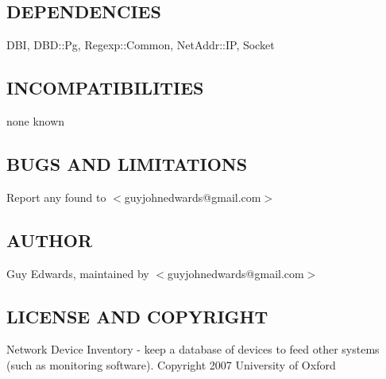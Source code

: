 \documentclass{book}
\begin{document}
\subsection{DEPENDENCIES}
\label{Inventory::Interfaces_DEPENDENCIES}
\hypertarget{Inventory::Interfaces_DEPENDENCIES}{}



DBI, DBD::Pg, Regexp::Common, NetAddr::IP, Socket


\subsection{INCOMPATIBILITIES}
\label{Inventory::Interfaces_INCOMPATIBILITIES}
\hypertarget{Inventory::Interfaces_INCOMPATIBILITIES}{}



none known


\subsection{BUGS AND LIMITATIONS}
\label{Inventory::Interfaces_BUGS_AND_LIMITATIONS}
\hypertarget{Inventory::Interfaces_BUGS_AND_LIMITATIONS}{}



Report any found to $<$guyjohnedwards@gmail.com$>$


\subsection{AUTHOR}
\label{Inventory::Interfaces_AUTHOR}
\hypertarget{Inventory::Interfaces_AUTHOR}{}



Guy Edwards, maintained by $<$guyjohnedwards@gmail.com$>$


\subsection{LICENSE AND COPYRIGHT}
\label{Inventory::Interfaces_LICENSE_AND_COPYRIGHT}
\hypertarget{Inventory::Interfaces_LICENSE_AND_COPYRIGHT}{}



Network Device Inventory - keep a database of devices to feed other systems (such as monitoring software). Copyright 2007 University of Oxford
\end{document}
